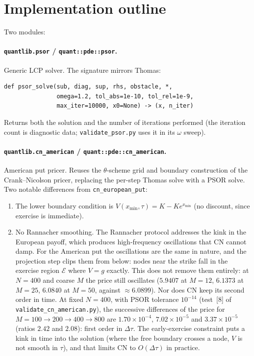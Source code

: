 \documentclass[11pt,a4paper]{article}
\begin{document}
\section{Implementation outline}

Two modules:

\paragraph{\texttt{quantlib.psor} / \texttt{quant::pde::psor}.}
Generic LCP solver. The signature mirrors Thomas:
\begin{verbatim}
def psor_solve(sub, diag, sup, rhs, obstacle, *,
               omega=1.2, tol_abs=1e-10, tol_rel=1e-9,
               max_iter=10000, x0=None) -> (x, n_iter)
\end{verbatim}
Returns both the solution and the number of iterations performed
(the iteration count is diagnostic data; \texttt{validate\_psor.py}
uses it in its $\omega$ sweep).

\paragraph{\texttt{quantlib.cn\_american} / \texttt{quant::pde::cn\_american}.}
American put pricer. Reuses the $\theta$-scheme grid and boundary
construction of the Crank--Nicolson pricer, replacing the per-step Thomas solve with a
PSOR solve. Two notable differences from \texttt{cn\_european\_put}:
\begin{enumerate}[leftmargin=2em]
\item The lower boundary condition is $V(x_{\min}, \tau) = K
- K e^{x_{\min}}$ (no discount, since exercise is immediate).
\item No Rannacher smoothing. The Rannacher protocol addresses the
kink in the European payoff, which produces high-frequency
oscillations that CN cannot damp. For the American put the
oscillations are the same in nature, and the projection step clips
them from below: nodes near the strike fall in the exercise region
$\mathcal{E}$ where $V = g$ exactly. This does not remove them
entirely: at $N = 400$ and coarse $M$ the price still oscillates
($5.9407$ at $M = 12$, $6.1373$ at $M = 25$, $6.0840$ at $M = 50$,
against $\approx 6.0899$). Nor does CN keep its second order in time.
At fixed $N = 400$, with PSOR tolerance $10^{-14}$ (test~[8] of
\texttt{validate\_cn\_american.py}), the successive
differences of the price for $M = 100 \to 200 \to 400 \to 800$ are
$1.70\times10^{-4}$, $7.02\times10^{-5}$ and $3.37\times10^{-5}$ (ratios
$2.42$ and $2.08$): first order in $\Delta\tau$. The early-exercise
constraint puts a kink in time into the solution (where the free
boundary crosses a node, $V$ is not smooth in $\tau$), and that limits
CN to $O(\Delta\tau)$ in practice.
\end{enumerate}
\end{document}
